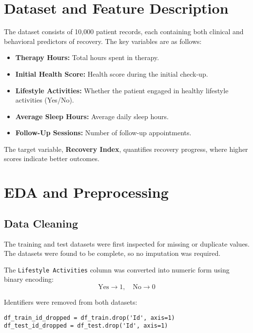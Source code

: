 \documentclass[12pt,a4paper]{article}
\begin{document}
\section{Dataset and Feature Description}

The dataset consists of 10,000 patient records, each containing both clinical and behavioral predictors of recovery. The key variables are as follows:

\begin{itemize}
    \item \textbf{Therapy Hours:} Total hours spent in therapy.
    \item \textbf{Initial Health Score:} Health score during the initial check-up.
    \item \textbf{Lifestyle Activities:} Whether the patient engaged in healthy lifestyle activities (Yes/No).
    \item \textbf{Average Sleep Hours:} Average daily sleep hours.
    \item \textbf{Follow-Up Sessions:} Number of follow-up appointments.
\end{itemize}

The target variable, \textbf{Recovery Index}, quantifies recovery progress, where higher scores indicate better outcomes.

\section{EDA and Preprocessing}

\subsection{Data Cleaning}
The training and test datasets were first inspected for missing or duplicate values. The datasets were found to be complete, so no imputation was required.

The \texttt{Lifestyle Activities} column was converted into numeric form using binary encoding:
\[
\text{Yes} \rightarrow 1, \quad \text{No} \rightarrow 0
\]

Identifiers were removed from both datasets:
\begin{verbatim}
df_train_id_dropped = df_train.drop('Id', axis=1)
df_test_id_dropped = df_test.drop('Id', axis=1)
\end{verbatim}
\end{document}
